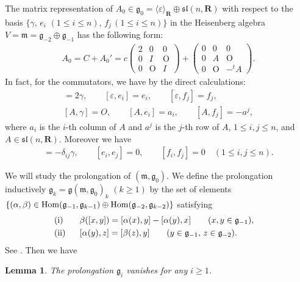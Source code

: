 \documentclass[pdftex]{sigma}
\newtheorem{Lem}[Th]{Lemma}
{ \theoremstyle{definition}
\newtheorem{Def}[Th]{Definition}
\newtheorem{Rem}[Th]{Remark}
\newtheorem{Ex}[Th]{Example}}
\begin{document}
The matrix representation of $A_0 \in \mathfrak{g}_0=\langle\varepsilon\rangle_{{\mathbf{R}}} \oplus {\mathfrak{sl}}(n, {\mathbf{R}})$
with respect to the basis $\{ \gamma, \, e_i $ $(1 \leq i \leq n),\,   f_j\,  (1 \leq i \leq n) \}$ in
the Heisenberg algebra
$V= \mathfrak{m} = \mathfrak{g}_{-2}\oplus \mathfrak{g}_{-1}$
has the following form:
\begin{gather*}
A_0=C+A_0'=
 c
\begin{pmatrix}
2 & 0 & 0 \\
0 & I & \mathrm{O} \\
0 & \mathrm{O} & I
\end{pmatrix}
+
\begin{pmatrix}
0 & 0 & 0 \\
0 & A & \mathrm{O} \\
0 & \mathrm{O} & -{}^t\!A
\end{pmatrix}.
\end{gather*}
In fact, for the commutators, we have by the direct calculations:
\begin{gather*}
[\varepsilon, \gamma] = 2\gamma,
\qquad
[\varepsilon, e_i] = e_i,
\qquad
[\varepsilon, f_j] = f_j,
\\
[A, \gamma] = O,
\qquad
[A, e_i] = a_i,
\qquad
[A, f_j] = - a^j,
\end{gather*}
where $a_i$ is the $i$-th column of $A$ and $a^j$ is the $j$-th row of $A$,
$1 \leq i, j \leq n$, and $A \in {\mathfrak{sl}}(n, {\mathbf{R}})$.
Moreover we have
\begin{gather*}
[e_i, f_j] = - \delta_{ij}\gamma, \qquad [e_i, e_j] = 0, \qquad [f_i, f_j] = 0 \quad (1 \leq i, j \leq n).
\end{gather*}

We will study the prolongation of
$({\mathfrak m}, {\mathfrak g}_0)$.
We def\/ine the prolongation inductively
${\mathfrak g}_k = {\mathfrak g}({\mathfrak m}, {\mathfrak g}_0)_k$ $(k \geq 1)$ by
the set of elements
$\{
(\alpha, \beta) \in  {\rm Hom}({\mathfrak g}_{-1}, {\mathfrak g}_{k-1})\oplus
{\rm Hom}({\mathfrak g}_{-2}, {\mathfrak g}_{k-2})\}$ satisfying
\begin{alignat*}{3}
& {\rm (i)} \ \ && \beta([x, y]) = [\alpha(x), y] - [\alpha(y), x]   \qquad (x, y \in {\mathfrak g}_{-1}), &
\\
& {\rm (ii)} \ \ && [\alpha(y), z] = [\beta(z), y]  \qquad (y \in {\mathfrak g}_{-1},\, z \in {\mathfrak g}_{-2}).&
\end{alignat*}
See \cite[p.~429]{Y}. Then we have

\begin{Lem}
\label{prolongation-calculation}
The prolongation ${\mathfrak g}_i$ vanishes for any $i \geq 1$.
\end{Lem}
\end{document}
